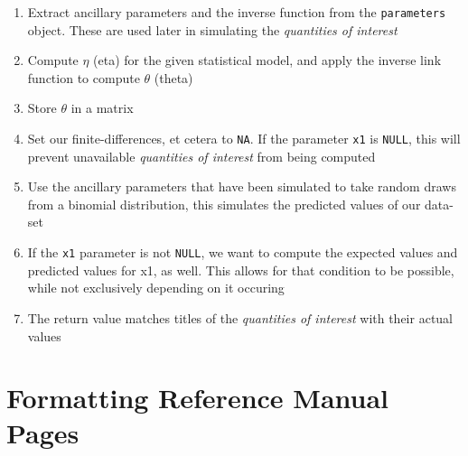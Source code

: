 \begin{enumerate}
	\item{Extract ancillary parameters and the inverse function from the {\tt parameters} object.  These are used later in simulating the \emph{quantities of interest}}
	\item{Compute $\eta$ (eta) for the given statistical model, and apply the inverse link function to compute $\theta$ (theta)}
	\item{Store $\theta$ in a matrix}
	\item{Set our finite-differences, et cetera to {\tt NA}.  If the parameter {\tt x1} is {\tt NULL}, this will prevent unavailable \emph{quantities of interest} from being computed}
	\item{Use the ancillary parameters that have been simulated to take random draws from a binomial distribution, this simulates the predicted values of our data-set}
	\item{If the {\tt x1} parameter is not {\tt NULL}, we want to compute the expected values and predicted values for x1, as well.  This allows for that condition to be possible, while not exclusively depending on it occuring}
	\item{The return value matches titles of the \emph{quantities of interest} with their actual values}
\end{enumerate}



%

\section{Formatting Reference Manual Pages}  \label{s:format}

